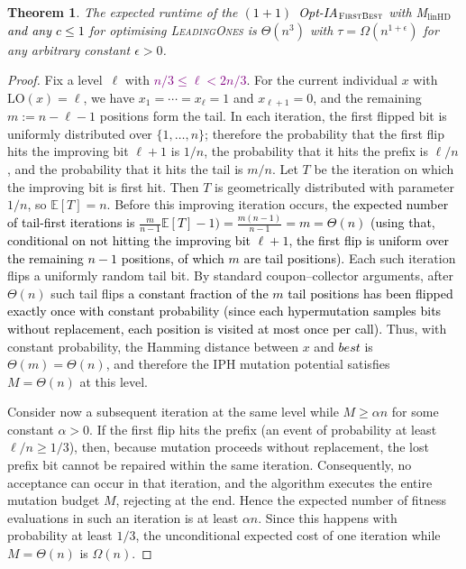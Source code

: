 \documentclass[lettersize,journal]{IEEEtran}
\newcommand{\new}[1]{\textcolor{black}{#1}}
\newcommand{\rerev}[1]{\textcolor{purple}{#1}}
\newcommand{\EE}{\mathbb{E}}
\newcommand{\linHD}{M$_{\text{linHD}}$}
\newtheorem{theorem}{Theorem}
\begin{document}
\setcounter{theorem}{7}
\begin{theorem}\label{thm:FBleadingones}
The expected runtime of the \new{$(1+1)$~Opt-IA$_{\textsc{FirstBest}}$}  with {\linHD } \new{and any $c\leq 1$} for optimising
\textsc{LeadingOnes} is $\Theta(n^3)$ with $\tau=\Omega(n^{1+\epsilon})$ for any arbitrary
constant $\epsilon>0$.
\end{theorem}
\begin{proof}

Fix a level~$\ell$ with \rerev{$n/3 \le \ell < 2n/3$}. For the current individual $x$ with $\mathrm{LO}(x)=\ell$, we have $x_1=\cdots=x_{\ell}=1$ and $x_{\ell+1}=0$, and the remaining $m:=n-\ell-1$ positions form the tail. In each iteration, the first flipped bit is uniformly distributed over $\{1,\dots,n\}$; therefore the probability that the first flip hits the improving bit $\ell+1$ is $1/n$, the probability that it hits the prefix is $\ell/n$, and the probability that it hits the tail is $m/n$. Let $T$ be the iteration on which the improving bit is first hit. Then $T$ is geometrically distributed with parameter~$1/n$, so $\EE[T]=n$. Before this improving iteration occurs, \textcolor{black}{the expected number of tail-first iterations is
$\frac{m}{n-1}\EE[T]-1) = \frac{m(n-1)}{n-1} = m = \Theta(n)$
(using that, conditional on not hitting the improving bit $\ell+1$, the
first flip is uniform over the remaining $n-1$ positions, of which $m$
are tail positions).} Each such iteration flips a uniformly random tail bit. By standard coupon--collector arguments, after $\Theta(n)$ such tail flips \textcolor{black}{a constant fraction of the $m$ tail positions has been flipped exactly once
with constant probability (since each hypermutation samples bits without
replacement, each position is visited at most once per call).} Thus, with constant probability, the Hamming distance between $x$ and \textcolor{black}{$\mathit{best}$} is $\Theta(m)=\Theta(n)$, and therefore the IPH mutation potential satisfies $M=\Theta(n)$ at this level.

Consider now a subsequent iteration at the same level while $M\ge \alpha n$ for some constant $\alpha>0$. If the first flip hits the prefix (an event of probability at least $\ell/n\ge 1/3$), then, because mutation proceeds without replacement, the lost prefix bit cannot be repaired within the same iteration. Consequently, no acceptance can occur in that iteration, and the algorithm executes the entire mutation budget $M$, rejecting at the end. Hence the expected number of fitness evaluations in such an iteration is at least $\alpha n$. Since this happens with probability at least $1/3$, the unconditional expected cost of one iteration while $M=\Theta(n)$ is $\Omega(n)$.


\end{proof}
\end{document}
